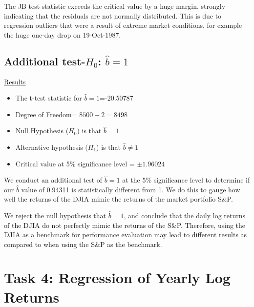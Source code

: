 \documentclass[a4paper]{article}
\begin{document}
	The JB test statistic exceeds the critical value by a huge margin, strongly indicating that the residuals are not normally distributed. This is due to regression outliers that were a result of extreme market conditions, for example the huge one-day drop on 19-Oct-1987. 
	

	\subsection{Additional test-$H_0$: $\hat{b}=1$}
	\underline{Results}
	\begin{itemize}[nosep]
		\item The t-test statistic for $\hat{b}=1$=-20.50787
		\item Degree of Freedom= $8500 - 2 = 8498$
		\item Null Hypothesis ($H_0$) is that $\hat{b}=1$
		\item Alternative hypothesis ($H_1$) is that $\hat{b} \ne 1$
		\item Critical value at 5\% significance level = $\pm 1.96024$
	\end{itemize}

	We conduct an additional test of $\hat{b}=1$ at the 5\% significance level to determine if our $\hat{b}$ value of 0.94311 is statistically different from 1. We do this to gauge how well the returns of the DJIA mimic the returns of the market portfolio S\&P.
	
	We reject the null hypothesis that $\hat{b}=1$, and conclude that the daily log returns of the DJIA do not perfectly mimic the returns of the S\&P. Therefore, using the DJIA as a benchmark for performance evaluation may lead to different results as compared to when using the S\&P as the benchmark. 
		
	\section*{Task 4: Regression of Yearly Log Returns}
	\label{sec:num2}
	
\end{document}

